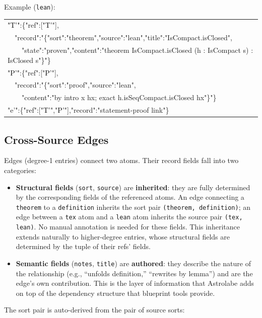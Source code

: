 \noindent Example (\texttt{lean}):

\medskip
{\scriptsize\ttfamily
\begin{tabular}{@{}l@{}}
\textcolor{black}{"T'"}:\{"ref":["\textcolor{black}{T'}"],\\
\ \ "record":"\{"sort":"theorem","source":"lean","title":"IsCompact.isClosed",\\
\ \ \ \ "state":"proven","content":"theorem IsCompact.isClosed (h : IsCompact s) : IsClosed s"\}"\}\\[3pt]
\textcolor{black}{"P'"}:\{"ref":["\textcolor{black}{P'}"],\\
\ \ "record":"\{"sort":"proof","source":"lean",\\
\ \ \ \ "content":"by intro x hx; exact h.isSeqCompact.isClosed hx"\}"\}\\[3pt]
\textcolor{blue!70!black}{"e'"}:\{"ref":["\textcolor{black}{T'}","\textcolor{black}{P'}"],"record":"statement-proof link"\}
\end{tabular}
}
\medskip

\subsection{Cross-Source Edges}

Edges (degree-1 entries) connect two atoms. Their record fields fall into two categories:
\begin{itemize}
  \item \textbf{Structural fields} (\texttt{sort}, \texttt{source}) are \textbf{inherited}: they are fully determined by the corresponding fields of the referenced atoms. An edge connecting a \texttt{theorem} to a \texttt{definition} inherits the sort pair \texttt{(theorem, definition)}; an edge between a \texttt{tex} atom and a \texttt{lean} atom inherits the source pair \texttt{(tex, lean)}. No manual annotation is needed for these fields. This inheritance extends naturally to higher-degree entries, whose structural fields are determined by the tuple of their refs' fields.
  \item \textbf{Semantic fields} (\texttt{notes}, \texttt{title}) are \textbf{authored}: they describe the nature of the relationship (e.g., ``unfolds definition,'' ``rewrites by lemma'') and are the edge's own contribution. This is the layer of information that Astrolabe adds on top of the dependency structure that blueprint tools provide.
\end{itemize}

\noindent The sort pair is auto-derived from the pair of source sorts:

